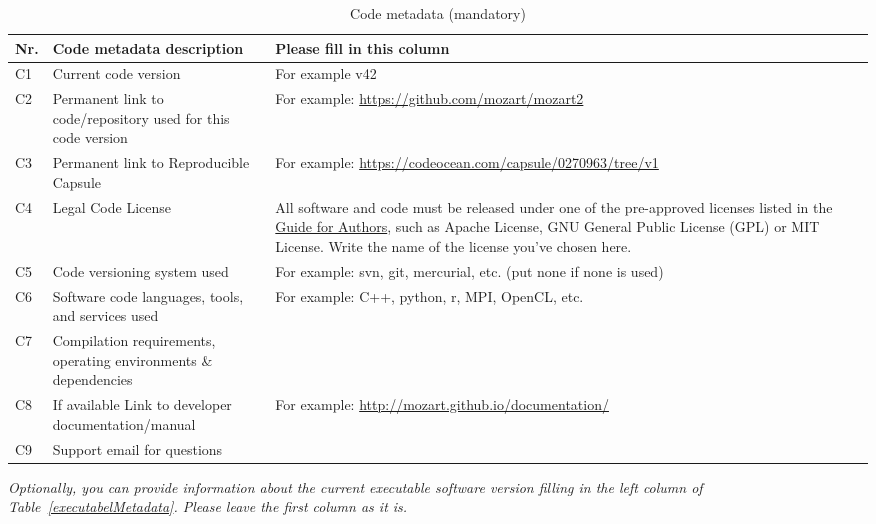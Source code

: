 \documentclass[preprint,12pt, a4paper]{elsarticle}
\begin{document}
\begin{table}[!h]
\begin{tabular}{|l|p{6.5cm}|p{6.5cm}|}
\hline
\textbf{Nr.} & \textbf{Code metadata description} & \textbf{Please fill in this column} \\
\hline
C1 & Current code version & For example v42 \\
\hline
C2 & Permanent link to code/repository used for this code version & For example: \url{https://github.com/mozart/mozart2} \\
\hline
C3  & Permanent link to Reproducible Capsule & For example: \url{https://codeocean.com/capsule/0270963/tree/v1}\\
\hline
C4 & Legal Code License   & All software and code must be released under one of the pre-approved licenses listed in the \href{https://www.elsevier.com/journals/softwarex/2352-7110/guide-for-authors}{Guide for Authors}, such as Apache License, GNU General Public License (GPL) or MIT License. Write the name of the license you’ve chosen here. \\
\hline
C5 & Code versioning system used & For example: svn, git, mercurial,
                                   etc. (put none if none is used) \\
\hline
C6 & Software code languages, tools, and services used & For example: C++, python, r, MPI, OpenCL, etc. \\
\hline
C7 & Compilation requirements, operating environments \& dependencies & \\
\hline
C8 & If available Link to developer documentation/manual & For example: \url{http://mozart.github.io/documentation/} \\
\hline
C9 & Support email for questions & \\
\hline
\end{tabular}
\caption{Code metadata (mandatory)}
\label{codeMetadata} 
\end{table}

\textit{Optionally, you can provide information about the current executable
software version filling in the left column of
Table~\ref{executabelMetadata}. Please leave the first column as it is.}
\end{document}

